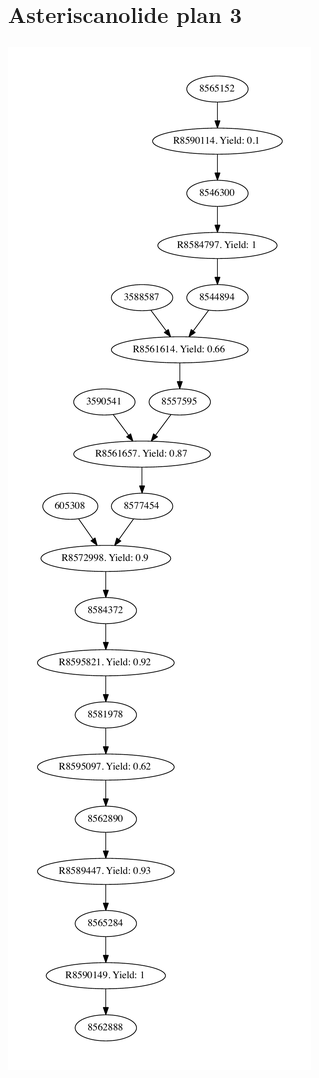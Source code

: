 \documentclass[a4paper,10pt,titlepage]{paper}
\begin{document}
\subsection{Asteriscanolide plan 3}
\centering
\includegraphics[scale=0.4]{Synteseplaner/Asteriscanolide/plan3.pdf}
\label{Appendix::Asteriscanolide3}
\end{document}
